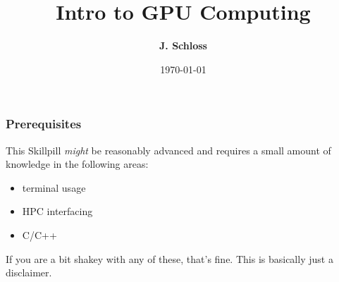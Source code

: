 \documentclass{beamer}
\title[Presentation Skills]{Intro to GPU Computing}
\author{\textbf{J. Schloss}} %
\institute[OIST] %
{
\textbf{james.schloss@oist.jp} %
}
\date{\today} %
\begin{document}
\begin{frame}
\vspace*{1.4cm}
\titlepage %
\end{frame}



\begin{frame}
\frametitle{Prerequisites}
This Skillpill \textit{might} be reasonably advanced and requires a small amount of knowledge in the following areas:
\begin{itemize}
\item terminal usage 
\item HPC interfacing
\item C/C++
\end{itemize}

If you are a bit shakey with any of these, that's fine. This is basically just a disclaimer.
\end{frame}
\end{document}
